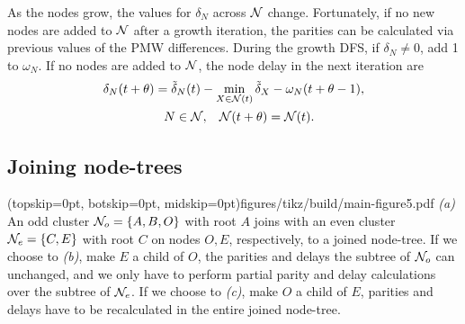 As the nodes grow, the values for $\delta_N$ across $\mathcal{N}$ change. %
Fortunately, if no new nodes are added to $\mathcal{N}$ after a growth iteration, the parities %
can be calculated via previous values of the PMW differences. %
During the growth DFS, if $\delta_N \neq 0$, add 1 to $\omega_N$. If no nodes are added to $\mathcal{N}$, the node delay in the next iteration are
\begin{multline}\label{eq:delay}
    \delta_N(t+\theta) = \tilde{\delta}_N(t) - \min_{X \in \mathcal{N}(t)}{\tilde{\delta}_X} - \omega_N(t+\theta-1),  \\
    \hspace{.3cm} N \in \mathcal{N}, \hspace{.3cm} \mathcal{N}(t+\theta) = \mathcal{N}(t).  
\end{multline}


\subsection{Joining node-trees}\label{sec:nodejoin}

\Figure[b](topskip=0pt, botskip=0pt, midskip=0pt){figures/tikz/build/main-figure5.pdf}{
    \emph{(a)} An odd cluster $\mathcal{N}_o=\{A, B, O\}$ with root $A$ joins with an even cluster $\mathcal{N}_e=\{C, E\}$ with root $C$ on nodes $O, E$, respectively, to a joined node-tree. If we choose to \emph{(b)}, make $E$ a child of $O$, the parities and delays the subtree of $\mathcal{N}_o$ can unchanged, and we only have to perform partial parity and delay calculations over the subtree of $\mathcal{N}_e$. If we choose to \emph{(c)}, make $O$ a child of $E$, parities and delays have to be recalculated in the entire joined node-tree. \label{fig:inversion}}

